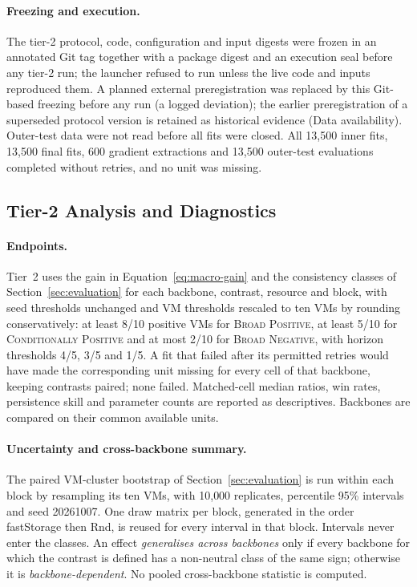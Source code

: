 \documentclass[5p,twocolumn]{elsarticle}
\begin{document}
\paragraph{Freezing and execution.} The tier-2 protocol, code, configuration
and input digests were frozen in an annotated Git tag together with a package
digest and an execution seal before any tier-2 run; the launcher refused to
run unless the live code and inputs reproduced them. A planned external
preregistration was replaced by this Git-based freezing before any run
(a logged deviation); the earlier preregistration of a superseded protocol
version is retained as historical evidence (Data availability). Outer-test
data were not read before all fits were closed. All 13{,}500 inner fits,
13{,}500 final fits, 600 gradient extractions and 13{,}500 outer-test
evaluations completed without retries, and no unit was missing.

\subsection{Tier-2 Analysis and Diagnostics}
\label{sec:tier2-analysis}

\paragraph{Endpoints.} Tier~2 uses the gain in
Equation~\ref{eq:macro-gain} and the consistency classes of
Section~\ref{sec:evaluation} for each backbone, contrast, resource and
block, with seed thresholds unchanged and VM thresholds rescaled to ten VMs
by rounding conservatively: at least 8/10 positive VMs for
\textsc{Broad Positive}, at least 5/10 for \textsc{Conditionally Positive}
and at most 2/10 for \textsc{Broad Negative}, with horizon thresholds 4/5,
3/5 and 1/5. A fit that failed after its permitted retries would have made
the corresponding unit missing for every cell of that backbone, keeping
contrasts paired; none failed. Matched-cell median ratios, win rates,
persistence skill and parameter counts are reported as descriptives.
Backbones are compared on their common available units.

\paragraph{Uncertainty and cross-backbone summary.} The paired VM-cluster
bootstrap of Section~\ref{sec:evaluation} is run within each block by
resampling its ten VMs, with 10{,}000 replicates, percentile 95\% intervals
and seed 20261007. One draw matrix per block, generated in the order
fastStorage then Rnd, is reused for every interval in that block. Intervals
never enter the classes. An effect \emph{generalises across backbones} only
if every backbone for which the contrast is defined has a non-neutral class
of the same sign; otherwise it is \emph{backbone-dependent}. No pooled
cross-backbone statistic is computed.
\end{document}
